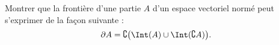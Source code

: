 \begin{exercice}\label{exoGeomAnal-0006}

	Montrer que la frontière d'une partie $A$ d'un espace vectoriel normé peut s'exprimer de la façon suivante :
	\begin{equation}
		\partial A=\complement\big( \Int(A)\cup\Int(\complement A) \big).
	\end{equation}

\end{exercice}
